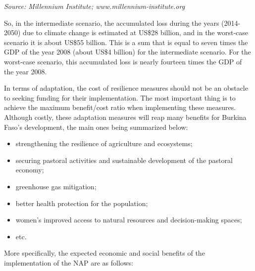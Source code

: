\documentclass[
]{book}
\begin{document}
\emph{Source: Millennium Institute; www.millennium-institute.org}

So, in the intermediate scenario, the accumulated loss during the years (2014-2050) due to climate change is estimated at US\$28 billion, and in the worst-case scenario it is about US\$55 billion. This is a sum that is equal to seven times the GDP of the year 2008 (about US\$4 billion) for the intermediate scenario. For the worst-case scenario, this accumulated loss is nearly fourteen times the GDP of the year 2008.

In terms of adaptation, the cost of resilience measures should not be an obstacle to seeking funding for their implementation. The most important thing is to achieve the maximum benefit/cost ratio when implementing these measures. Although costly, these adaptation measures will reap many benefits for Burkina Faso's development, the main ones being summarized below:

\begin{itemize}
\item
  strengthening the resilience of agriculture and ecosystems;
\item
  securing pastoral activities and sustainable development of the pastoral economy;
\item
  greenhouse gas mitigation;
\item
  better health protection for the population;
\item
  women's improved access to natural resources and decision-making spaces;
\item
  etc.
\end{itemize}

More specifically, the expected economic and social benefits of the implementation of the NAP are as follows:
\end{document}
